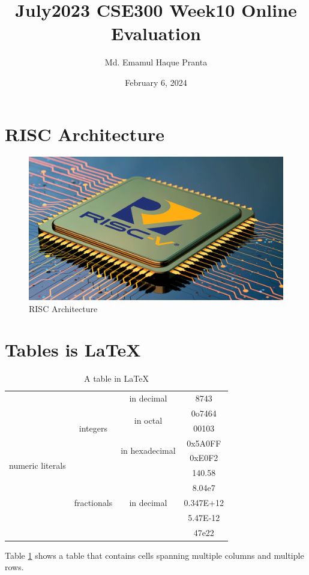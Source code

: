 \documentclass[10pt]{article}
\title{July2023 CSE300 Week10 Online Evaluation}
\author{Md. Emamul Haque Pranta}
\date{February 6, 2024}
\begin{document}
\maketitle
\tableofcontents
\pagebreak
\section{RISC Architecture}
\begin{figure}[h]
    \centering
    \includegraphics[scale=0.2]{Image/risc.png}
    \caption{RISC Architecture}
    \label{fig:enter-label}
\end{figure}
\section{Tables is \LaTeX}
\begin{table}[h]
    \centering
    \begin{tabular}{|c|c|c|c|}
    \hline
        \multirow{10}{*}{numeric literals}&\multirow{5}{*}{integers}&in decimal&8743\\
        \cline{3-4}
        &&\multirow{2}{*}{in octal}&0o7464\\
        \cline{4-4}
        &&&00103\\
        \cline{3-4}
        &&\multirow{2}{*}{in hexadecimal}&0x5A0FF\\
        \cline{4-4}
        &&&0xE0F2\\
        \cline{2-4}
        &\multirow{5}{*}{fractionals}&\multirow{5}{*}{in decimal}&140.58\\
        \cline{4-4}
        &&&8.04e7\\
        \cline{4-4}
        &&&0.347E+12\\
        \cline{4-4}
        &&&5.47E-12\\
        \cline{4-4}
        &&&47e22\\
        \hline
    \end{tabular}
    \caption{A table in \LaTeX}
    \label{tab:my_label}
\end{table}
Table \ref{tab:my_label} shows a table that contains cells spanning multiple columns and multiple rows.\cite{spec}
\pagebreak
\end{document}
